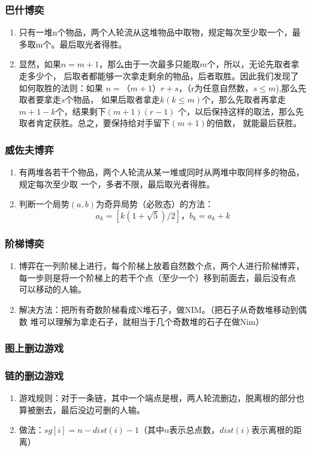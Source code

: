 \subsubsection{巴什博奕}
	\begin{enumerate}
		\item 
			只有一堆n个物品，两个人轮流从这堆物品中取物，规定每次至少取一个，最多取m个。最后取光者得胜。
		\item
			显然，如果$n=m+1$，那么由于一次最多只能取$m$个，所以，无论先取者拿走多少个，
			后取者都能够一次拿走剩余的物品，后者取胜。因此我们发现了如何取胜的法则：如果
			$n=（m+1）r+s$，（r为任意自然数，$s \leq m$),那么先取者要拿走$s$个物品，
			如果后取者拿走$k(k \leq m)$个，那么先取者再拿走$m+1-k$个，结果剩下$(m+1)(r-1)$
			个，以后保持这样的取法，那么先取者肯定获胜。总之，要保持给对手留下$(m+1)$的倍数，
			就能最后获胜。
	\end{enumerate}
\subsubsection{威佐夫博弈}
	\begin{enumerate}
		\item 
			有两堆各若干个物品，两个人轮流从某一堆或同时从两堆中取同样多的物品，规定每次至少取
			一个，多者不限，最后取光者得胜。
		\item
			判断一个局势$(a, b)$为奇异局势（必败态）的方法：
			$$a_k =[k (1+\sqrt{5})/2]，b_k= a_k + k$$
	\end{enumerate}
\subsubsection{阶梯博奕}
	\begin{enumerate}
		\item
			博弈在一列阶梯上进行，每个阶梯上放着自然数个点，两个人进行阶梯博弈，
			每一步则是将一个阶梯上的若干个点（至少一个）移到前面去，最后没有点
			可以移动的人输。
		\item
			解决方法：把所有奇数阶梯看成N堆石子，做NIM。（把石子从奇数堆移动到偶数
			堆可以理解为拿走石子，就相当于几个奇数堆的石子在做Nim）
	\end{enumerate}
\subsubsection{图上删边游戏}
	\subsubsection{链的删边游戏}
		\begin{enumerate}
			\item
				游戏规则：对于一条链，其中一个端点是根，两人轮流删边，脱离根的部分也算被删去，最后没边可删的人输。
			\item
				做法：$sg[i] = n - dist(i) - 1$（其中$n$表示总点数，$dist(i)$表示离根的距离）
		\end{enumerate}
